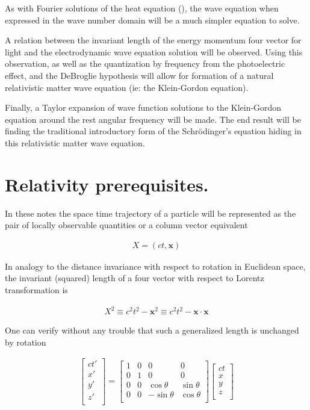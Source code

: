 \documentclass[]{eliblog}
\newcommand{\Bx}[0]{\mathbf{x}}
\begin{document}
As with Fourier solutions of the heat equation (\cite{osgoodFourier}), the wave equation when expressed in the wave number domain will be a much simpler equation to solve. 

A relation between the invariant length of the energy momentum four vector for light and the electrodynamic wave equation solution will be observed.  Using this observation, as well as the quantization by frequency from the photoelectric effect, and the DeBroglie hypothesis will allow for formation of a natural relativistic matter wave equation (ie: the Klein-Gordon equation).

Finally, a Taylor expansion of wave function solutions to the Klein-Gordon equation around the rest angular frequency will be made.  The end result will be finding the traditional introductory form of the Schr\"{o}dinger's equation hiding in this relativistic matter wave equation.

\section{Relativity prerequisites.}

In these notes the space time trajectory of a particle will be represented as the pair of locally observable quantities or a column vector equivalent

\begin{align}
X = (ct, \Bx)
\end{align}

In analogy to the distance invariance with respect to rotation in Euclidean space, the 
invariant (squared) length of a four vector with respect to Lorentz transformation is

\begin{align}
X^2 \equiv c^2 t^2 - \Bx^2 \equiv c^2 t^2 - \Bx \cdot \Bx
\end{align}

One can verify without any trouble that such a generalized length is unchanged by rotation

\begin{align}
\begin{bmatrix}
ct' \\
x' \\
y' \\
z' \\
\end{bmatrix}
=
\begin{bmatrix}
1 & 0 & 0 & 0 \\
0 & 1 & 0 & 0 \\
0 & 0 & \cos\theta & \sin\theta \\
0 & 0 & -\sin\theta & \cos\theta \\
\end{bmatrix}
\begin{bmatrix}
ct \\
x \\
y \\
z \\
\end{bmatrix}
\end{align}
\end{document}
